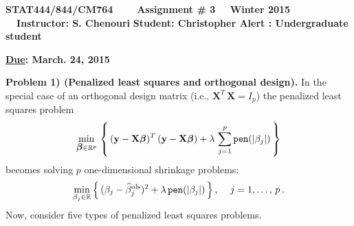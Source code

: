 \documentclass[11pt]{report}
\newcommand{\bfmath}[1]{\mbox{\boldmath$#1$\unboldmath}}
\begin{document}
\begin{center}
{\bf STAT444/844/CM764 ~~~ Assignment \# 3 ~~Winter 2015 ~~Instructor: S. Chenouri}
{\bf Student: Christopher Alert : Undergraduate student}
\end{center} 
\noindent
{\bf \underline {Due}: March. 24, 2015}\\
\noindent
\vspace{1mm} 

\noindent
{\bf Problem 1) (Penalized least squares and orthogonal design).} In the special case
of an orthogonal design matrix (i.e., $\mathbf{X}^T\,\mathbf{X}=I_p$) the penalized least squares problem
$$\min\limits_{\bfmath{\beta}\in\mathbb{R}^p}\,\left\lbrace\, (\mathbf{y}-\mathbf{X}\bfmath{\beta})^T\,(\mathbf{y}-\mathbf{X}\bfmath{\beta})+\lambda\,\sum\limits_{j=1}^p {\tt pen}(|\beta_j|)\,\right\rbrace$$
becomes solving $p$ one-dimensional shrinkage problems:
$$\min\limits_{\beta_j\in\mathbb{R}}\left\lbrace\,(\beta_j-\widehat{\beta}_j^{\rm ols})^2+\lambda\,{\tt pen}(|\beta_j|)\,\right\rbrace,\,\quad j=1,\dots,\,p\,.$$
Now, consider five types of penalized least squares problems.
\end{document}
